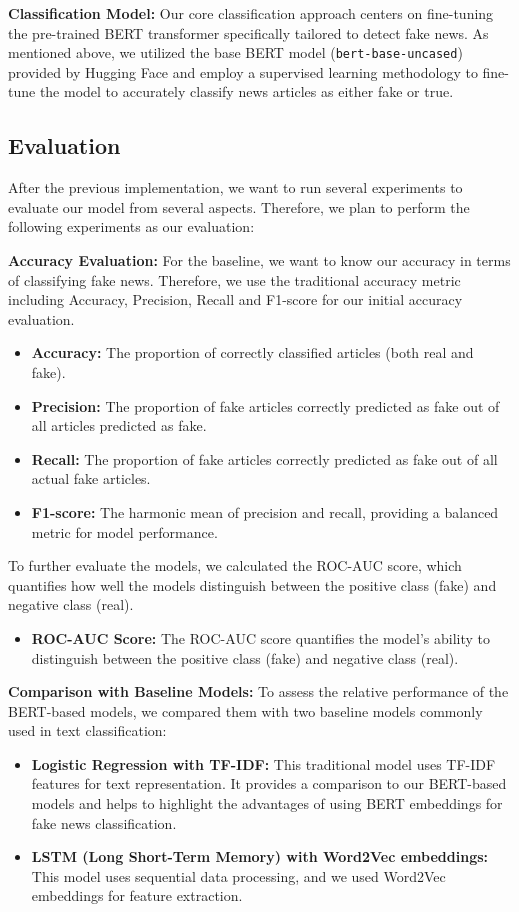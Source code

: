 \documentclass[11pt,a4paper]{article}
\begin{document}
\textbf{Classification Model:} Our core classification approach centers on fine-tuning the pre-trained BERT transformer specifically tailored to detect fake news. 
As mentioned above, we utilized the base BERT model (\texttt{bert-base-uncased}) provided by Hugging Face and employ a supervised learning methodology to fine-tune the model to accurately classify news articles as either fake or true.

\subsection{Evaluation}
After the previous implementation, we want to run several experiments to evaluate our model from several aspects. Therefore, we plan to perform the following experiments as our evaluation:

\textbf{Accuracy Evaluation:}
For the baseline, we want to know our accuracy in terms of classifying fake news. Therefore, we use the traditional accuracy metric including Accuracy, Precision, Recall and F1-score for our initial accuracy evaluation.
\begin{itemize}
    \item \textbf{Accuracy:} The proportion of correctly classified articles (both real and fake).
    \item \textbf{Precision:} The proportion of fake articles correctly predicted as fake out of all articles predicted as fake.
    \item \textbf{Recall:} The proportion of fake articles correctly predicted as fake out of all actual fake articles.
    \item \textbf{F1-score:} The harmonic mean of precision and recall, providing a balanced metric for model performance.
\end{itemize}

To further evaluate the models, we calculated the ROC-AUC score, which quantifies how well the models distinguish between the positive class (fake) and negative class (real).
\begin{itemize}
    \item \textbf{ROC-AUC Score:} The ROC-AUC score quantifies the model's ability to distinguish between the positive class (fake) and negative class (real).
\end{itemize}

\textbf{Comparison with Baseline Models:}
To assess the relative performance of the BERT-based models, we compared them with two baseline models commonly used in text classification:
\begin{itemize}
    \item \textbf{Logistic Regression with TF-IDF:} This traditional model uses TF-IDF features for text representation. It provides a comparison to our BERT-based models and helps to highlight the advantages of using BERT embeddings for fake news classification.
    \item \textbf{LSTM (Long Short-Term Memory) with Word2Vec embeddings:} This model uses sequential data processing, and we used Word2Vec embeddings for feature extraction.
\end{itemize}
\end{document}
